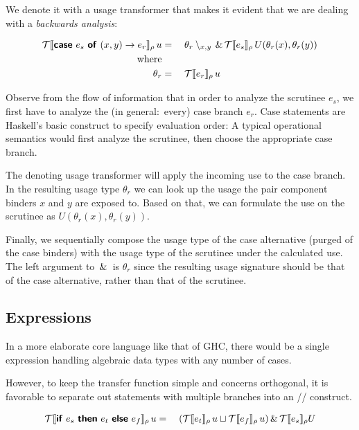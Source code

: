 We denote it with a usage transformer that makes it evident that we are dealing with a \emph{backwards analysis}:

\begin{alignat*}{2}
  \mathcal{T}\llbracket\text{\textsf{\textbf{case}}}~e_s~\text{\textsf{\textbf{of}}}~(x,y)\rightarrow e_r\rrbracket_{\rho}\,u &{}={}&& \theta_r\setminus_{x,y} \,\&\, \mathcal{T}\llbracket e_s\rrbracket_{\rho}\,U(\theta_r(x),\theta_r(y)) \\
   \text{where} \\
   \theta_r &{}={}&& \mathcal{T}\llbracket e_r\rrbracket_{\rho}\,u 
\end{alignat*}

Observe from the flow of information that in order to analyze the scrutinee $e_s$, we first have to analyze the (in general:\ every) case branch $e_r$. 
Case statements are Haskell's basic construct to specify evaluation order: 
A typical operational semantics would first analyze the scrutinee, then choose the appropriate case branch.

The denoting usage transformer will apply the incoming use to the case branch.
In the resulting usage type $\theta_r$ we can look up the usage the pair component binders $x$ and $y$ are exposed to.
Based on that, we can formulate the use on the scrutinee as $U(\theta_r(x), \theta_r(y))$.

Finally, we sequentially compose the usage type of the case alternative (purged of the case binders) with the usage type of the scrutinee under the calculated use.
The left argument to $\,\&\,$ is $\theta_r$ since the resulting usage signature should be that of the case alternative, rather than that of the scrutinee.

\subsection{ Expressions}

In a more elaborate core language like that of GHC, there would be a single  expression handling algebraic data types with any number of cases.

However, to keep the transfer function simple and concerns orthogonal, it is favorable to separate out  statements with multiple branches into an // construct.

\begin{alignat*}{2}
  \mathcal{T}\llbracket\text{\textsf{\textbf{if}}}~e_s~\text{\textsf{\textbf{then}}}~{e_t}~\text{\textsf{\textbf{else}}}~{e_f}\rrbracket_{\rho}\,u &{}={}&& (\mathcal{T}\llbracket e_t\rrbracket_{\rho}\,u \sqcup \mathcal{T}\llbracket e_f\rrbracket_{\rho}\,u) \,\&\, \mathcal{T}\llbracket e_s\rrbracket_{\rho} U \\
\end{alignat*}

